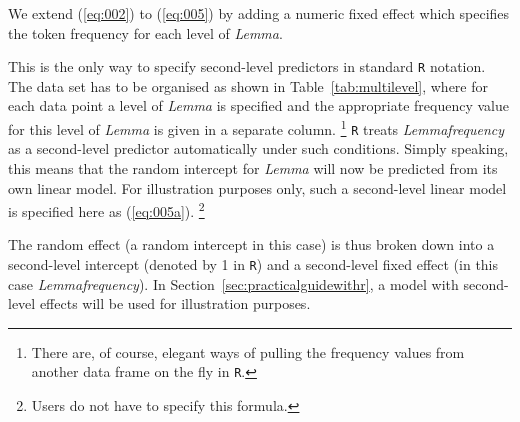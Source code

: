 We extend (\ref{eq:002}) to (\ref{eq:005}) by adding a numeric fixed effect which specifies the token frequency for each level of \textit{Lemma}.


This is the only way to specify second-level predictors in standard \texttt{R} notation.
The data set has to be organised as shown in Table~\ref{tab:multilevel}, where for each data point a level of \textit{Lemma} is specified and the appropriate frequency value for this level of \textit{Lemma} is given in a separate column.%
\footnote{There are, of course, elegant ways of pulling the frequency values from another data frame on the fly in \texttt{R}.}
\texttt{R} treats \textit{Lemmafrequency} as a second-level predictor automatically under such conditions.
Simply speaking, this means that the random intercept for \textit{Lemma} will now be predicted from its own linear model.
For illustration purposes only, such a second-level linear model is specified here as (\ref{eq:005a}).%
\footnote{Users do not have to specify this formula.}


The random effect (a random intercept in this case) is thus broken down into a second-level intercept (denoted by 1 in \texttt{R}) and a second-level fixed effect (in this case \textit{Lemmafrequency}).
In Section~\ref{sec:practicalguidewithr}, a model with second-level effects will be used for illustration purposes.


